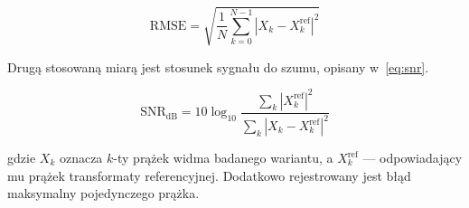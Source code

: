 \begin{equation}\label{eq:rmse}
\mathrm{RMSE} = \sqrt{\frac{1}{N}\sum_{k=0}^{N-1}
    \left| X_k - X_k^{\mathrm{ref}} \right|^2}
\end{equation}

Drugą stosowaną miarą jest stosunek sygnału do szumu, opisany
w~\cref{eq:snr}.

\begin{equation}\label{eq:snr}
\mathrm{SNR}_{\mathrm{dB}} = 10 \log_{10}
    \frac{\sum_k |X_k^{\mathrm{ref}}|^2}{\sum_k |X_k - X_k^{\mathrm{ref}}|^2}
\end{equation}

gdzie $X_k$ oznacza $k$-ty prążek widma badanego wariantu, a
$X_k^{\mathrm{ref}}$ --- odpowiadający mu prążek transformaty referencyjnej.
Dodatkowo rejestrowany jest błąd maksymalny pojedynczego prążka.